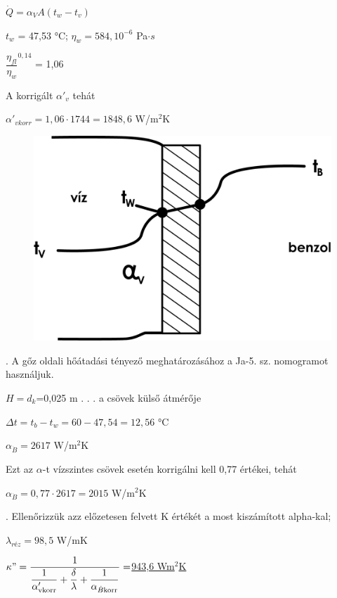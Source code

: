 \vspace{5mm}
$\dot{Q}=\alpha_V A (t_w -t_v)$

\vspace{5mm}
$t_w$ = 47,53 °C;  $\eta_w=584,10^{-6}$ Pa$\cdot s$

\vspace{5mm}
$\dfrac{\eta_{fl}}{\eta_{w}}^{0,14}$ = 1,06

\vspace{5mm}
A korrigált $\alpha'_{v}$ tehát

\vspace{5mm}
$\alpha'_{vkorr} = 1,06 \cdot 1744=1848,6$ W/m$^2$K


\begin{figure}[H]
	\begin{center}
		\includegraphics[width=0.5\linewidth]{u9awby123/fig05.png}
	\end{center}
\end{figure}

\vspace{5mm}
. A gőz oldali hőátadási tényező meghatározásához a Ja-5. sz. nomogramot használjuk.

$H=d_k$=0,025 m . . . a csövek külső átmérője

$\Delta t=t_b-t_w=60-47,54=12,56$ °C

$\alpha_{\dot{B}}=2617$ W/m$^2$K

\vspace{5mm}
Ezt az $\alpha$-t vízszintes csövek esetén korrigálni kell 0,77 értékei, tehát 

\vspace{5mm}
$\alpha_{\dot{B}}=0,77 \cdot 2617=2015$ W/m$^2$K

\vspace{5mm}
. Ellenőrizzük azz előzetesen felvett K értékét a most kiszámított alpha-kal;

\vspace{5mm}
$\lambda_{réz}=98,5$ W/mK

\vspace{5mm}
$\kappa"=\dfrac{1}{{\dfrac{1}{\alpha'_{\textmd{vkorr}}}}+\dfrac{\delta}{\lambda}+\dfrac{1}{\alpha_{\dot{B}\textmd{korr}}}}=$\underline{943,6 Wm$^2$K}

